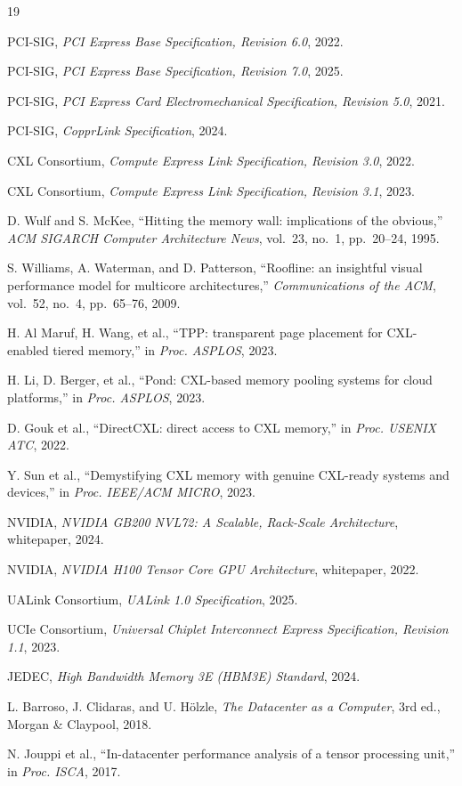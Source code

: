 \documentclass[10pt,letterpaper]{article}
\begin{document}
\clearpage
\begin{thebibliography}{19}
\small
\setlength{\itemsep}{1pt}
\setlength{\parsep}{0pt}

 PCI-SIG, \emph{PCI Express Base Specification, Revision 6.0}, 2022.

 PCI-SIG, \emph{PCI Express Base Specification, Revision 7.0}, 2025.

 PCI-SIG, \emph{PCI Express Card Electromechanical Specification, Revision 5.0}, 2021.

 PCI-SIG, \emph{CopprLink Specification}, 2024.

 CXL Consortium, \emph{Compute Express Link Specification, Revision 3.0}, 2022.

 CXL Consortium, \emph{Compute Express Link Specification, Revision 3.1}, 2023.

 D. Wulf and S. McKee, ``Hitting the memory wall: implications of the obvious,'' \emph{ACM SIGARCH Computer Architecture News}, vol.~23, no.~1, pp.~20--24, 1995.

 S. Williams, A. Waterman, and D. Patterson, ``Roofline: an insightful visual performance model for multicore architectures,'' \emph{Communications of the ACM}, vol.~52, no.~4, pp.~65--76, 2009.

 H. Al Maruf, H. Wang, et al., ``TPP: transparent page placement for CXL-enabled tiered memory,'' in \emph{Proc. ASPLOS}, 2023.

 H. Li, D. Berger, et al., ``Pond: CXL-based memory pooling systems for cloud platforms,'' in \emph{Proc. ASPLOS}, 2023.

 D. Gouk et al., ``DirectCXL: direct access to CXL memory,'' in \emph{Proc. USENIX ATC}, 2022.

 Y. Sun et al., ``Demystifying CXL memory with genuine CXL-ready systems and devices,'' in \emph{Proc. IEEE/ACM MICRO}, 2023.

 NVIDIA, \emph{NVIDIA GB200 NVL72: A Scalable, Rack-Scale Architecture}, whitepaper, 2024.

 NVIDIA, \emph{NVIDIA H100 Tensor Core GPU Architecture}, whitepaper, 2022.

 UALink Consortium, \emph{UALink 1.0 Specification}, 2025.

 UCIe Consortium, \emph{Universal Chiplet Interconnect Express Specification, Revision 1.1}, 2023.

 JEDEC, \emph{High Bandwidth Memory 3E (HBM3E) Standard}, 2024.

 L. Barroso, J. Clidaras, and U. H\"olzle, \emph{The Datacenter as a Computer}, 3rd ed., Morgan \& Claypool, 2018.

 N. Jouppi et al., ``In-datacenter performance analysis of a tensor processing unit,'' in \emph{Proc. ISCA}, 2017.

\end{thebibliography}
\end{document}
